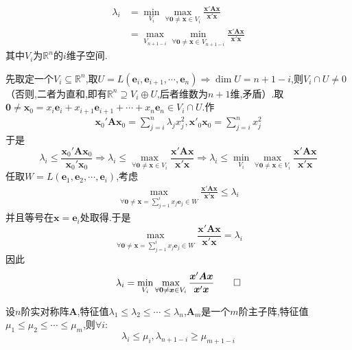 \begin{formal}
    \begin{theorem}\label{thm:Courant-Fischer定理}
        \begin{align*}
        \lambda_i&=\min_{V_i}\max_{\forall\bm{0}\neq\bm{x}\in V_i}\frac{\bm{x}'\bm{Ax}}{\bm{x}'\bm{x}} \\
        &=\max_{V_{n+1-i}}\min_{\forall\bm{0}\neq\bm{x}\in V_{n+1-i}}\frac{\bm{x}'\bm{Ax}}{\bm{x}'\bm{x}}
        \end{align*}其中$V_i$为$\mathbb{R}^n$的$i$维子空间.
    \end{theorem}
    \begin{Proof}
        先取定一个$V_i\subseteq\mathbb{R}^n$,取$U=L\left(
            \bm{e}_i,\bm{e}_{i+1},\cdots,\bm{e}_n
        \right)\Longrightarrow\dim U=n+1-i$,则$V_i\cap U\neq 0$（否则,二者为直和,即有$\mathbb{R}^n\supseteq V_i\oplus U$,后者维数为$n+1$维,矛盾）.取$\bm{0}\neq\bm{x}_0=x_i\bm{e}_i+x_{i+1}\bm{e}_{i+1}+\cdots+x_n\bm{e}_n\in V_i\cap U$.作\begin{align*}
            \bm{x}_0'\bm{Ax}_0=\sum_{j=i}^{n}\lambda_jx_j^2,\bm{x}'_0\bm{x}_0=\sum_{j=i}^{n}x_j^2
        \end{align*}于是\[
        \lambda_i\leqslant\frac{\bm{x}_0'\bm{Ax}_0}{\bm{x}_0'\bm{x}_0}\Longrightarrow\lambda_i\leqslant\max_{\forall\bm{0}\neq\bm{x}\in V_i}\frac{\bm{x}'\bm{Ax}}{\bm{x}'\bm{x}}\Longrightarrow\lambda_i\leqslant\min_{V_i}\max_{\forall\bm{0}\neq\bm{x}\in V_i}\frac{\bm{x}'\bm{Ax}}{\bm{x}'\bm{x}}
        \]任取$W=L\left(
            \bm{e}_1,\bm{e}_2,\cdots,\bm{e}_i
        \right)$,考虑\begin{align*}
            \max_{\forall\bm{0}\neq\bm{x}=\sum\limits_{j=1}^{i}x_j\bm{e}_j\in W}\frac{\bm{x}'\bm{Ax}}{\bm{x}'\bm{x}}\leqslant\lambda_i
        \end{align*}并且等号在$\bm{x}=\bm{e}_i$处取得.于是\[
        \max_{\forall\bm{0}\neq\bm{x}=\sum\limits_{j=1}^{i}x_j\bm{e}_j\in W}\frac{\bm{x}'\bm{Ax}}{\bm{x}'\bm{x}}=\lambda_i\]因此\[
        \lambda_i=\min_{V_i}\max_{\forall\bm{0}\neq\bm{x}\in V_i}\frac{\bm{x}'\bm{Ax}}{\bm{x}'\bm{x}}\qedhere
        \]
    \end{Proof}
\end{formal}
\begin{formal}
    \begin{theorem}[Cauchy交错定理]\label{thm:Cauchy交错定理}
        设$n$阶实对称阵$\bm{A}$,特征值$\lambda_1\leqslant\lambda_2\leqslant\cdots\leqslant\lambda_n$,$\bm{A}_m$是一个$m$阶主子阵,特征值$\mu_1\leqslant\mu_2\leqslant\cdots\leqslant\mu_m$,则$\forall i:$\[
        \lambda_i\leqslant\mu_i,\lambda_{n+1-i}\geqslant\mu_{m+1-i}
        \]
    \end{theorem}
\end{formal}
